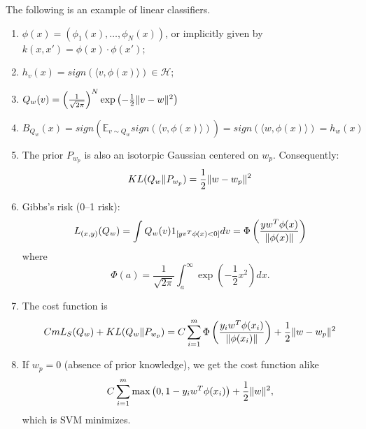 The following is an example of linear classifiers.
\begin{enumerate}
    \item $ \phi(x) = (\phi_1(x), \ldots, \phi_N(x)) $, or implicitly given by $ k(x,x') = \phi(x) \cdot \phi(x') $;
    \item $ h_v(x) = sign(\langle v, \phi(x) \rangle) \in \mathcal{H} $;
    \item $ Q_w(v) = {\left( \frac{1}{\sqrt{2\pi}}  \right)}^N \exp \left( - \frac{1}{2} \Arrowvert v - w \Arrowvert^2 \right) $
    \item $ B_{Q_{w}}(x) = sign(\mathbb{E}_{v \sim Q_{w}} sign( \langle v, \phi(x) \rangle) ) = sign(\langle w, \phi(x) \rangle) = h_{w}(x) $
    \item The prior $ P_{w_{p}} $ is also an isotorpic Gaussian centered on $ w_{p} $. Consequently:
        \[
            KL(Q_{w} \Arrowvert P_{w_p}) = \frac{1}{2} \Arrowvert w - w_p \Arrowvert^2
        \]
    \item Gibbs's risk ({0--1} risk):
        \[
            L_{(x, y)}(Q_w) = \int Q_w(v) 1_{[y v^T \phi(x) < 0]} dv
            = \Phi\left( \frac{y w^T \phi(x)}{ \Arrowvert \phi(x) \Arrowvert}  \right)
        \]
        where
        \[
            \Phi(a) = \frac{1}{\sqrt{2\pi}} \int^\infty_a \exp\left( -\frac{1}{2} x^2 \right) dx.
        \]
       \item The cost function is
       \[
           Cm L_{S}(Q_w) + KL(Q_w \Arrowvert P_{w_p}) = 
           C \sum^{m}_{i=1} \Phi\left( \frac{y_i w^T \phi(x_i)}{ \Arrowvert \phi(x_i) \Arrowvert}  \right) + \frac{1}{2} \Arrowvert w - w_p \Arrowvert^2
       \]
   \item If $ w_p = 0 $ (absence of prior knowledge), we get the cost function alike
       \[
           C \sum^{m}_{i=1} \max \left( 0, 1 - y_i w^T \phi(x_i) \right) + \frac{1}{2} \Arrowvert w \Arrowvert^2,
       \]
       which is SVM minimizes.
\end{enumerate}



